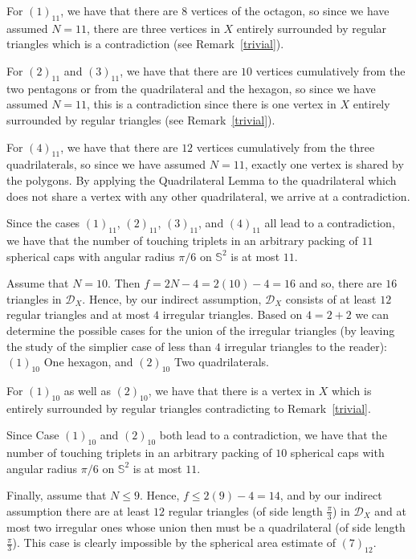 \documentclass[10pt]{article}
\numberwithin{Subcase}{Case}
\begin{document}
For $(1)_{11}$, we have that there are $8$ vertices of the octagon, so since we have assumed $N=11$, there are three vertices in $X$ entirely surrounded by regular triangles which is a contradiction (see Remark~\ref{trivial}).

For $(2)_{11}$ and $(3)_{11}$, we have that there are $10$ vertices cumulatively from the two pentagons or from the quadrilateral and the hexagon, so since we have assumed $N=11$, this is a contradiction since there is one vertex in $X$ entirely surrounded by regular triangles (see Remark~\ref{trivial}).

For $(4)_{11}$, we have that there are $12$ vertices cumulatively from the three quadrilaterals, so since we have assumed $N=11$, exactly one vertex is shared by the polygons. By applying the Quadrilateral Lemma to the quadrilateral which does not share a vertex with any other quadrilateral, we arrive at a contradiction. 

Since the cases $(1)_{11}$, $(2)_{11}$, $(3)_{11}$, and $(4)_{11}$ all lead to a contradiction, we have that the number of touching triplets in an arbitrary packing of $11$ spherical caps with angular radius $\pi/6$ on $\mathbb{S}^2$ is at most $11$.

Assume that $N=10$. Then $f=2N-4=2(10)-4=16$ and so, there are $16$ triangles in $\mathcal{D}_{X}$. Hence, by our indirect assumption, $\mathcal{D}_{X}$ consists of at least $12$ regular triangles and at most $4$ irregular triangles. Based on $4=2+2$ we can determine the possible cases for the union of the irregular triangles (by leaving the study of the simplier case of less than $4$ irregular triangles to the reader): $(1)_{10}$ One hexagon, and $(2)_{10}$ Two quadrilaterals.

For $(1)_{10}$ as well as $(2)_{10}$, we have that there is a vertex in $X$ which is  entirely surrounded by regular triangles contradicting to Remark~\ref{trivial}.

Since Case $(1)_{10}$ and $(2)_{10}$ both lead to a contradiction, we have that the number of touching triplets in an arbitrary packing of $10$ spherical caps with angular radius $\pi/6$ on $\mathbb{S}^2$ is at most $11$.

Finally, assume that $N \leq 9$. Hence, $f\leq 2(9) - 4 = 14$, and by our indirect assumption there are at least $12$ regular triangles (of side length $\frac{\pi}{3}$) in $\mathcal{D}_{X}$ and at most two irregular ones whose union then must be a quadrilateral (of side length $\frac{\pi}{3}$). This case is clearly impossible by the spherical area estimate of $(7)_{12}$.
\end{document}
